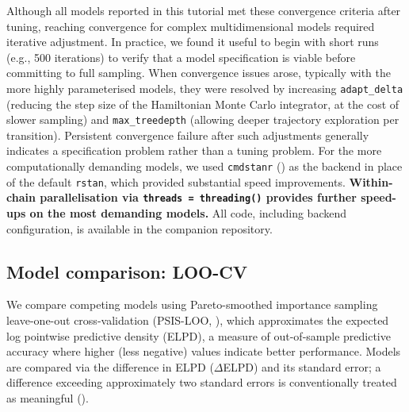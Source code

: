 \documentclass[
  man,
  floatsintext,
  longtable,
  nolmodern,
  notxfonts,
  notimes,
  colorlinks=true,linkcolor=blue,citecolor=blue,urlcolor=blue]{apa7}
\newcommand{\rev}[1]{\textbf{\textcolor{revcol}{#1}}}  %
\begin{document}
Although all models reported in this tutorial met these convergence
criteria after tuning, reaching convergence for complex multidimensional
models required iterative adjustment. In practice, we found it useful to
begin with short runs (e.g., 500 iterations) to verify that a model
specification is viable before committing to full sampling. When
convergence issues arose, typically with the more highly parameterised
models, they were resolved by increasing \texttt{adapt\_delta} (reducing
the step size of the Hamiltonian Monte Carlo integrator, at the cost of
slower sampling) and \texttt{max\_treedepth} (allowing deeper trajectory
exploration per transition). Persistent convergence failure after such
adjustments generally indicates a specification problem rather than a
tuning problem. For the more computationally demanding models, we used
\texttt{cmdstanr} ()
as the backend in place of the default \texttt{rstan}, which provided
substantial speed improvements.
\rev{Within-chain parallelisation via \texttt{threads = threading()} provides further speed-ups on the most demanding models.}
All code, including backend configuration, is available in the companion
repository.

\subsection{Model comparison: LOO-CV}\label{model-comparison-loo-cv}

We compare competing models using Pareto-smoothed importance sampling
leave-one-out cross-validation (PSIS-LOO,
), which
approximates the expected log pointwise predictive density (ELPD), a
measure of out-of-sample predictive accuracy where higher (less
negative) values indicate better performance. Models are compared via
the difference in ELPD (\(\Delta\)ELPD) and its standard error; a
difference exceeding approximately two standard errors is conventionally
treated as meaningful ().
\end{document}

